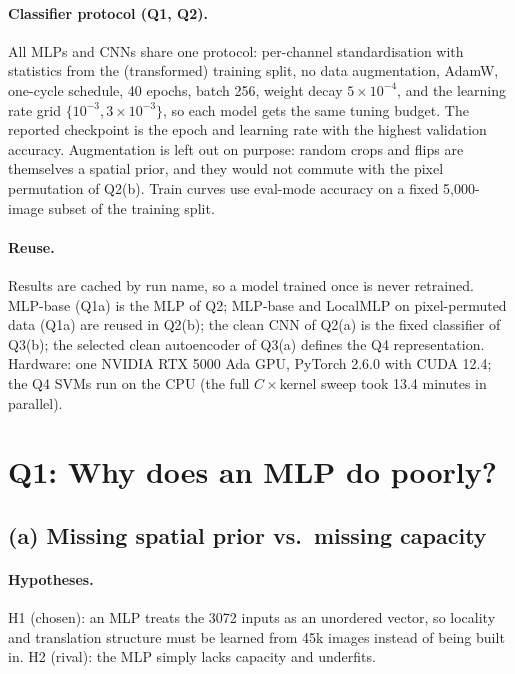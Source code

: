 \documentclass[10pt,twocolumn,a4paper]{article}
\begin{document}
\paragraph{Classifier protocol (Q1, Q2).} All MLPs and CNNs share one protocol: per-channel
standardisation with statistics from the (transformed) training split, no data augmentation,
AdamW, one-cycle schedule, 40 epochs, batch 256, weight decay $5\times10^{-4}$, and the learning
rate grid $\{10^{-3},3\times10^{-3}\}$, so each model gets the same tuning budget. The reported
checkpoint is the epoch and learning rate with the highest validation accuracy. Augmentation is
left out on purpose: random crops and flips are themselves a spatial prior, and they would not
commute with the pixel permutation of Q2(b). Train curves use eval-mode accuracy on a fixed
5{,}000-image subset of the training split.

\paragraph{Reuse.} Results are cached by run name, so a model trained once is never retrained.
MLP-base (Q1a) is the MLP of Q2; MLP-base and LocalMLP on pixel-permuted data (Q1a) are reused in
Q2(b); the clean CNN of Q2(a) is the fixed classifier of Q3(b); the selected clean autoencoder of
Q3(a) defines the Q4 representation. Hardware: one NVIDIA RTX 5000 Ada GPU, PyTorch 2.6.0 with
CUDA 12.4; the Q4 SVMs run on the CPU (the full $C\times$kernel sweep took 13.4 minutes in
parallel).

\section{Q1: Why does an MLP do poorly?}
\subsection{(a) Missing spatial prior vs.\ missing capacity}
\paragraph{Hypotheses.} H1 (chosen): an MLP treats the 3072 inputs as an unordered vector, so
locality and translation structure must be learned from 45k images instead of being built in.
H2 (rival): the MLP simply lacks capacity and underfits.
\end{document}
